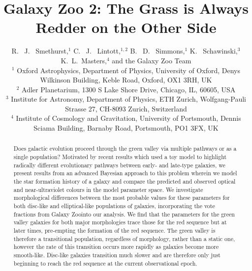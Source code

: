 \documentclass{mn2e}
\begin{document}
\title[The Star Fomation History of the Green Valley]{Galaxy Zoo 2: The Grass is Always Redder on the Other Side}
\author[Smethurst et al. 2014]{R. ~J. ~Smethurst,$^1$ C. ~J. ~Lintott,$^{1,2}$ B. ~D. ~Simmons,$^{1}$ K. ~Schawinski,$^{3}$ \newauthor K.~L.~Masters,$^{4}$ and the Galaxy Zoo Team
\\ $^1$ Oxford Astrophysics, Department of Physics, University of Oxford, Denys Wilkinson Building, Keble Road, Oxford, OX1 3RH, UK 
\\ $^2$ Adler Planetarium, 1300 S Lake Shore Drive, Chicago, IL, 60605, USA 
\\ $^3$ Institute for Astronomy, Department of Physics, ETH Zurich, Wolfgang-Pauli Strasse 27, CH-8093 Zurich, Switzerland 
\\ $^4$ Institute of Cosmology and Gravitation, University of Portsmouth, Dennis Sciama Building, Barnaby Road, Portsmouth, PO1 3FX, UK }

\maketitle

\begin{abstract}
Does galactic evolution proceed through the green valley via multiple pathways or as a single population? Motivated by recent results which used a toy model to highlight radically different evolutionary pathways between early- and late-type galaxies, we present results from an advanced Bayesian approach to this problem wherein we model the star formation history of a galaxy and compare the predicted and observed optical and near-ultraviolet colours in the model parameter space. We investigate morphological differences between the most probable values for these parameters for both disc-like and elliptical-like populations of galaxies, incorporating the vote fractions from Galaxy Zoo\footnotemark[1] into our analysis. We find that the parameters for the green valley galaxies for both major morphologies trace those for the red sequence but at later times, pre-empting the formation of the red sequence. The green valley is therefore a transitional population, regardless of morphology, rather than a static one, however the rate of this transition occurs more rapidly as galaxies become more smooth-like. Disc-like galaxies transition much slower and are therefore only just beginning to reach the red sequence at the current observational epoch.
\end{abstract}

\\
\end{document}
